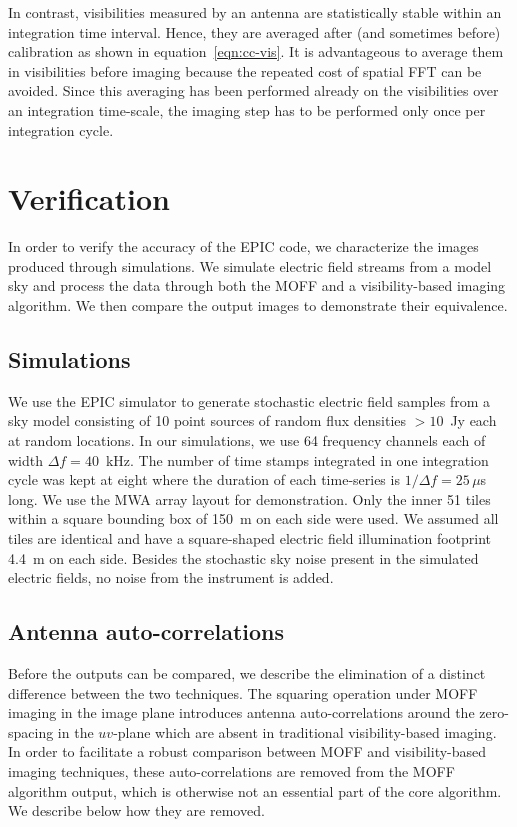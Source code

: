 \documentclass[a4paper,fleqn,usenatbib]{mnras}
\begin{document}
In contrast, visibilities measured by an antenna are statistically stable within an integration time interval. Hence, they are averaged after (and sometimes before) calibration as shown in equation~\ref{eqn:cc-vis}. It is advantageous to average them in visibilities before imaging because the repeated cost of spatial FFT can be avoided. Since this averaging has been performed already on the visibilities over an integration time-scale, the imaging step has to be performed only once per integration cycle. 

\section{Verification}\label{sec:verify}

In order to verify the accuracy of the EPIC code, we characterize the images produced through simulations. We simulate electric field streams from a model sky and process the data through both the MOFF and a visibility-based imaging algorithm. We then compare the output images to demonstrate their equivalence.

\subsection{Simulations}\label{sec:sim}

We use the EPIC simulator to generate stochastic electric field samples from a sky model consisting of 10 point sources of random flux densities $>10$~Jy each at random locations. In our simulations, we use 64 frequency channels each of width $\Delta f = 40$~kHz. The number of time stamps integrated in one integration cycle was kept at eight where the duration of each time-series is $1/\Delta f=25\,\mu$s long. We use the MWA array layout \citep{bea12} for demonstration. Only the inner 51 tiles within a square bounding box of 150~m on each side were used. We assumed all tiles are identical and have a square-shaped electric field illumination footprint 4.4~m on each side. Besides the stochastic sky noise present in the simulated electric fields, no noise from the instrument is added.

\subsection{Antenna auto-correlations}\label{sec:rm-autocorr}

Before the outputs can be compared, we describe the elimination of a distinct difference between the two techniques. The squaring operation under MOFF imaging in the image plane introduces antenna auto-correlations around the zero-spacing in the $uv$-plane which are absent in traditional visibility-based imaging. In order to facilitate a robust comparison between MOFF and visibility-based imaging techniques, these auto-correlations are removed from the MOFF algorithm output, which is otherwise not an essential part of the core algorithm. We describe below how they are removed. 
\end{document}
